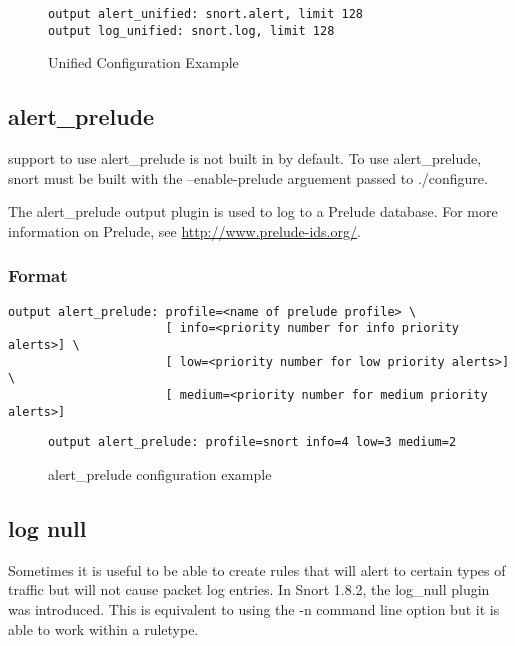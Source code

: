 \documentclass[english]{report}
\newenvironment{note}{
\samepage
    \vspace{10pt}{\textsf{
        {\hspace{7pt}\Huge{$\triangle$\hspace{-12.5pt}{\Large{$^!$}}}}\hspace{5pt}
        {\Large{NOTE}}
    }
    }
   \begin{center}
    \par\vspace{-17pt}

    \begin{lrbox}{\savepar}
    \begin{minipage}[r]{6in}
}
{
    \end{minipage}
    \end{lrbox}
    \fbox{
        \usebox{
            \savepar
	}
    }
    \par\vskip10pt
    \end{center}
}
\newenvironment{note}{
        \begin{rawhtml}
        <p><table border="1"><tr><td><b>
        Note:&nbsp;&nbsp;</b>
        \end{rawhtml}
}{
        \begin{rawhtml}
        </b></td></tr></table></p>
        \end{rawhtml}
}
\begin{document}
\begin{figure}[!hbpt]
\begin{verbatim}
output alert_unified: snort.alert, limit 128
output log_unified: snort.log, limit 128
\end{verbatim}
\caption{Unified Configuration Example\label{unified example}}
\end{figure}


\subsection{alert\_prelude}

\begin{note}
support to use alert\_prelude is not built in by default.  To use alert\_prelude, snort must be built with the --enable-prelude arguement passed to ./configure.
\end{note}

The alert\_prelude output plugin is used to log to a Prelude database.  For more information on Prelude, see \url{http://www.prelude-ids.org/}.

\subsubsection{Format}

\begin{verbatim}
output alert_prelude: profile=<name of prelude profile> \
                      [ info=<priority number for info priority alerts>] \
                      [ low=<priority number for low priority alerts>] \
                      [ medium=<priority number for medium priority alerts>]
\end{verbatim}

\begin{figure}[!hbpt]
\begin{verbatim}
output alert_prelude: profile=snort info=4 low=3 medium=2
\end{verbatim}
\caption{alert\_prelude configuration example\label{prelude example}}
\end{figure}

\subsection{log null}

Sometimes it is useful to be able to create rules that will alert
to certain types of traffic but will not cause packet log entries.
In Snort 1.8.2, the log\_null plugin was introduced. This is equivalent
to using the -n command line option but it is able to work within
a ruletype.
\end{document}
